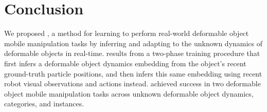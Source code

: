 \section{Conclusion}
We proposed \methodname{}, a method for learning to perform real-world deformable object mobile manipulation tasks by inferring and adapting to the unknown dynamics of deformable objects in real-time. \methodname{} results from a two-phase training procedure that first infers a deformable object dynamics embedding from the object's recent ground-truth particle positions, and then infers this same embedding using recent robot visual observations and actions instead. \methodname{} achieved success in two deformable object mobile manipulation tasks across unknown deformable object dynamics, categories, and instances. 
